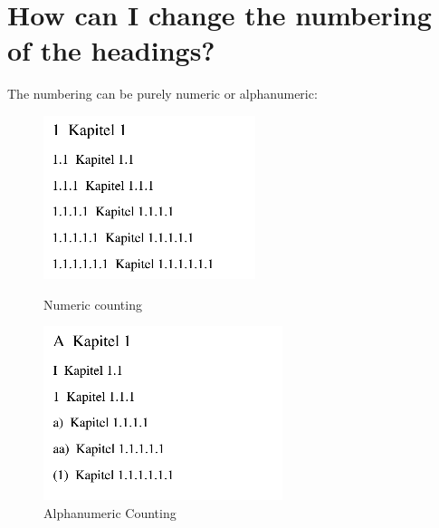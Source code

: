 \documentclass[12pt]{article}
\begin{document}
\section{How can I change the numbering of the headings?}
The numbering can be purely numeric or alphanumeric:
\begin{center}
\begin{figure}[!h]
  \centering
  \begin{minipage}[b]{0.4\textwidth}
    \includegraphics[width=\textwidth]{images/numericChapters.png}
    \caption{Numeric counting}
  \end{minipage}
  \hfill
  \begin{minipage}[b]{0.4\textwidth}
    \includegraphics[width=\textwidth]{images/alphaNumericChapters.png}
    \caption{Alphanumeric Counting}
  \end{minipage}
\end{figure}
\end{center}
\end{document}
